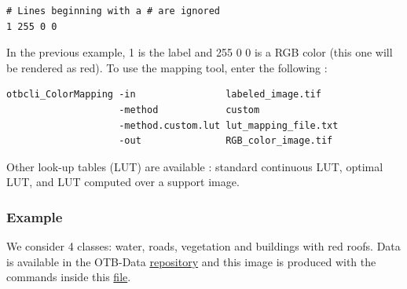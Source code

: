 \begin{verbatim}
# Lines beginning with a # are ignored
1 255 0 0
\end{verbatim}

In the previous example, 1 is the label and 255 0 0 is a RGB color
(this one will be rendered as red). To use the mapping tool, enter
the following :

\begin{verbatim}
otbcli_ColorMapping -in                labeled_image.tif
                    -method            custom
                    -method.custom.lut lut_mapping_file.txt
                    -out               RGB_color_image.tif
\end{verbatim}

Other look-up tables (LUT) are available : standard continuous LUT,
optimal LUT, and LUT computed over a support image.

\subsubsection{Example}

We consider 4 classes: water, roads, vegetation and buildings with red roofs.
Data is available in the OTB-Data
\href{http://hg.orfeo-toolbox.org/OTB-Data/file/0fed8f4f035c/Input/Classification}{repository}
and this image is produced with the commands inside this
\href{http://hg.orfeo-toolbox.org/OTB-Applications/file/3ce975605013/Testing/Classification/CMakeLists.txt}{file}.

